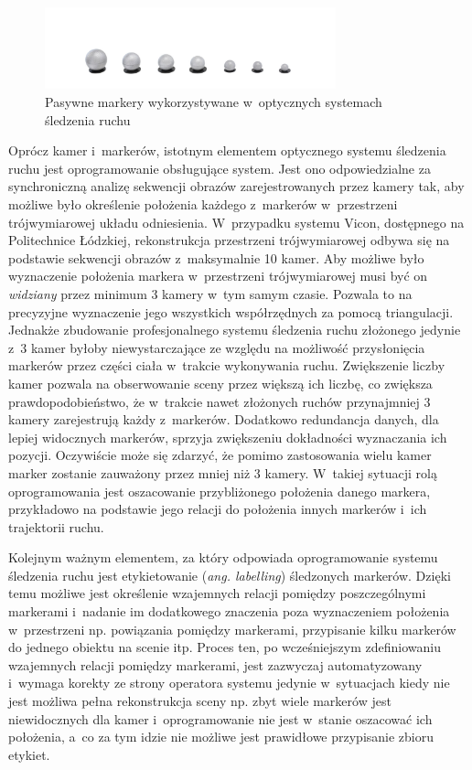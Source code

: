 \begin{figure}[!htp]
	\centering	
	\includegraphics[width=0.75\textwidth]{images/super-spherical-markers-hero.jpg}
	\caption{Pasywne markery wykorzystywane w~optycznych systemach śledzenia ruchu\cite{QulisysMarkers}}		
	\label{fig:literature:qualisys:markers}
\end{figure}

Oprócz kamer i~markerów, istotnym elementem optycznego systemu śledzenia ruchu jest oprogramowanie obsługujące system. Jest ono odpowiedzialne za synchroniczną analizę sekwencji obrazów zarejestrowanych przez kamery tak, aby możliwe było określenie położenia każdego z~markerów w~przestrzeni trójwymiarowej układu odniesienia. W~przypadku systemu Vicon, dostępnego na Politechnice Łódzkiej, rekonstrukcja przestrzeni trójwymiarowej odbywa się na podstawie sekwencji obrazów z~maksymalnie 10 kamer. Aby możliwe było wyznaczenie położenia markera w~przestrzeni trójwymiarowej musi być on \textsl{widziany} przez minimum 3 kamery w~tym samym czasie. Pozwala to na precyzyjne wyznaczenie jego wszystkich współrzędnych za pomocą triangulacji. Jednakże zbudowanie profesjonalnego systemu śledzenia ruchu złożonego jedynie z~3 kamer byłoby niewystarczające ze względu na możliwość przysłonięcia markerów przez części ciała w~trakcie wykonywania ruchu. Zwiększenie liczby kamer pozwala na obserwowanie sceny przez większą ich liczbę, co zwiększa prawdopodobieństwo, że w~trakcie nawet złożonych ruchów przynajmniej 3 kamery zarejestrują każdy z~markerów. Dodatkowo redundancja danych, dla lepiej widocznych markerów, sprzyja zwiększeniu dokładności wyznaczania ich pozycji. Oczywiście może się zdarzyć, że pomimo zastosowania wielu kamer marker zostanie zauważony przez mniej niż 3 kamery. W~takiej sytuacji rolą oprogramowania jest oszacowanie przybliżonego położenia danego markera, przykładowo na podstawie jego relacji do położenia innych markerów i~ich trajektorii ruchu.

Kolejnym ważnym elementem, za który odpowiada oprogramowanie systemu śledzenia ruchu jest etykietowanie (\emph{ang. labelling}) śledzonych markerów. Dzięki temu możliwe jest określenie wzajemnych relacji pomiędzy poszczególnymi markerami i~nadanie im dodatkowego znaczenia poza wyznaczeniem położenia w~przestrzeni np. powiązania pomiędzy markerami, przypisanie kilku markerów do jednego obiektu na scenie itp. Proces ten, po wcześniejszym zdefiniowaniu wzajemnych relacji pomiędzy markerami, jest zazwyczaj automatyzowany i~wymaga korekty ze strony operatora systemu jedynie w~sytuacjach kiedy nie jest możliwa pełna rekonstrukcja sceny np. zbyt wiele markerów jest niewidocznych dla kamer i~oprogramowanie nie jest w~stanie oszacować ich położenia, a~co za tym idzie nie możliwe jest prawidłowe przypisanie zbioru etykiet. 

